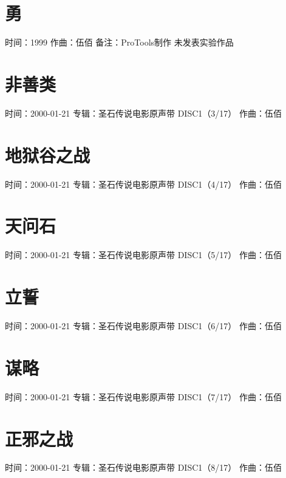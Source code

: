 \documentclass[UTF8,a4paper,oneside,twocolumn,12pt]{ctexbook}
\newcommand{\infopair}[2]{\textbullet #1：#2}
\newcommand{\zq}[1][伍佰]{\infopair{作曲}{#1}}
\newcommand{\zj}[1]{\infopair{专辑}{#1}}
\newcommand{\sj}[1]{\infopair{时间}{#1}}
\newcommand{\bz}[1]{\infopair{备注}{#1}}
\newenvironment{info}{\begin{flushleft}\kaishu
	}
	{\end{flushleft}\normalsize\yahei\par}
\begin{document}
\section{勇}%
\begin{info}
	\sj{1999}
	\zq
	\bz{ProTools制作 未发表实验作品}
\end{info}

\section{非善类}
\begin{info}
	\sj{2000-01-21}
	\zj{圣石传说电影原声带 DISC1（3/17）}
	\zq
\end{info}

\section{地狱谷之战}
\begin{info}
	\sj{2000-01-21}
	\zj{圣石传说电影原声带 DISC1（4/17）}
	\zq
\end{info}

\section{天问石}
\begin{info}
	\sj{2000-01-21}
	\zj{圣石传说电影原声带 DISC1（5/17）}
	\zq
\end{info}

\section{立誓}
\begin{info}
	\sj{2000-01-21}
	\zj{圣石传说电影原声带 DISC1（6/17）}
	\zq
\end{info}

\section{谋略}
\begin{info}
	\sj{2000-01-21}
	\zj{圣石传说电影原声带 DISC1（7/17）}
	\zq
\end{info}

\section{正邪之战}
\begin{info}
	\sj{2000-01-21}
	\zj{圣石传说电影原声带 DISC1（8/17）}
	\zq
\end{info}
\end{document}
